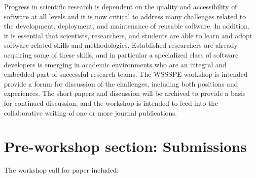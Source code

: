 \documentclass[11pt, oneside]{amsart}
\begin{document}
Progress in scientific research is dependent on the quality and accessibility of software at all levels and it is now critical to address many challenges related to the development, deployment, and maintenance of reusable software. In addition, it is essential that scientists, researchers, and students are able to learn and adopt software-related skills and methodologies. Established researchers are already acquiring some of these skills, and in particular a specialized class of software developers is emerging in academic environments who are an integral and embedded part of successful research teams. The WSSSPE workshop is intended provide a forum for discussion of the challenges, including both positions and experiences. The short papers and discussion will be archived to provide a basis for continued discussion, and the workshop is intended to feed into the collaborative writing of one or more journal publications.

\section{Pre-workshop section: Submissions}

The workshop call for paper included:
\end{document}
